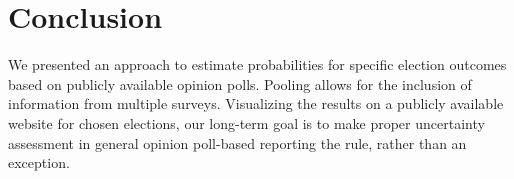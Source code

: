 \documentclass[smallcondensed]{svjour3}     %
\begin{document}
%
%
%


\section{Conclusion} \label{sec:conclusion}
We presented an approach to estimate probabilities for specific election outcomes based on publicly available opinion polls. Pooling allows for the inclusion of information from multiple surveys. Visualizing the results on a publicly available website for chosen elections, our long-term goal is to make proper uncertainty assessment
in general opinion poll-based reporting the rule, rather than an exception.
\end{document}
